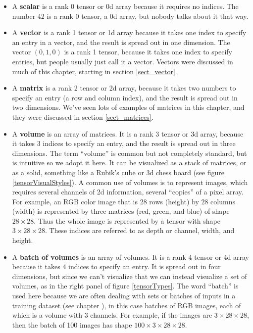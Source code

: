 \begin{itemize}
\item A \textbf{scalar} is a rank 0 tensor or 0d array because it requires no indices. The number 42 is a rank 0 tensor, a 0d array, but nobody talks about it that way. 
\item A \textbf{vector} is a rank 1 tensor or 1d array because it takes one index to specify an entry in a vector, and the result is spread out in one dimension. The vector $(0,1,0)$ is a rank 1 tensor, because it takes one index to specify entries, but people usually just call it a vector. Vectors were discussed in much of this chapter, starting in section \ref{sect_vector}.
\item A \textbf{matrix} is a rank 2 tensor or 2d array, because it takes two numbers to specify an entry (a row and column index), and the result is spread out in two dimensions. We've seen lots of examples of matrices in this chapter, and they were discussed in section \ref{sect_matrices}.
\item A \textbf{volume} is an array of matrices. It is a rank 3 tensor or 3d array, because it takes 3 indices to specify an entry, and the result is spread out in three dimensions. The term ``volume'' is common but not completely standard, but is intuitive so we adopt it here. It can be visualized as a stack of matrices, or as a solid, something like a Rubik's cube or 3d chess board (see figure \ref{tensorVisualStyles}). A common use of volumes is to represent images, which requires several channels of 2d information, several ``copies'' of a pixel array. For example, an RGB color image that is 28 rows (height) by 28 columns (width) is represented by three matrices (red, green, and blue) of shape $28 \times 28$. Thus the whole image is represented by a tensor with shape $3 \times 28 \times 28$.  These indices are referred to as depth or channel, width, and height. 
\item A \textbf{batch of volumes} is an array of volumes. It is a rank 4 tensor or 4d array because it takes 4 indices to specify an entry. It is spread out in four dimensions, but since we can't visualize that we can instead visualize a set of volumes, as in the right panel of figure \ref{tensorTypes}. The word ``batch'' is used here because we are often dealing with sets or batches of inputs in a training dataset (see chapter ), in this case batches of RGB images, each of which is a volume with 3 channels. For example, if the images are $3 \times 28 \times 28$, then the batch of 100 images has shape $100 \times 3 \times 28 \times 28$. 
\end{itemize}

